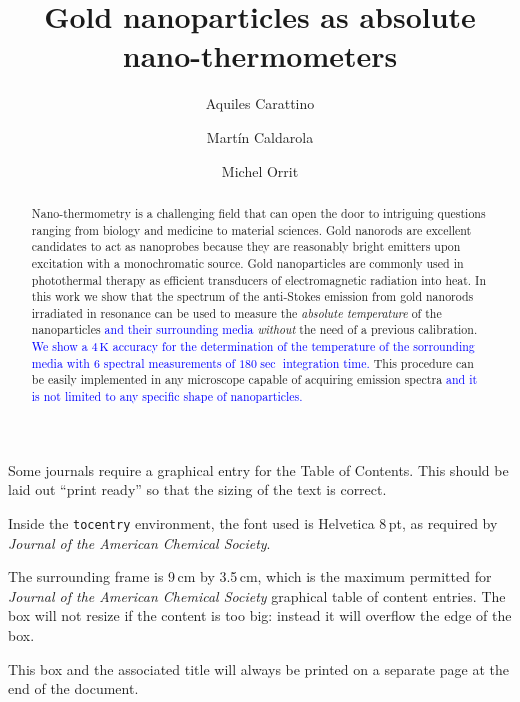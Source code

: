 \documentclass[journal=nalefd,manuscript=letter]{achemso}
\author{Aquiles Carattino}
\affiliation[Leiden]
{Huygens-Kamerlingh Onnes Lab, 2300RA Leiden, The Netherlands}
\author{Mart\'in Caldarola}
\affiliation[Leiden]
{Huygens-Kamerlingh Onnes Lab, 2300RA Leiden, The Netherlands}
\author{Michel Orrit}
\affiliation[Leiden]
{Huygens-Kamerlingh Onnes Lab, 2300RA Leiden, The Netherlands}
\title{Gold nanoparticles as absolute nano-thermometers}
\newcommand{\HI}[1]{\textcolor{blue}{#1}} %
\newcommand{\K}{\ensuremath{\,\textrm{K}}}
\begin{document}

\begin{tocentry}

Some journals require a graphical entry for the Table of Contents.
This should be laid out ``print ready'' so that the sizing of the
text is correct.

Inside the \texttt{tocentry} environment, the font used is Helvetica
8\,pt, as required by \emph{Journal of the American Chemical
Society}.

The surrounding frame is 9\,cm by 3.5\,cm, which is the maximum
permitted for  \emph{Journal of the American Chemical Society}
graphical table of content entries. The box will not resize if the
content is too big: instead it will overflow the edge of the box.

This box and the associated title will always be printed on a
separate page at the end of the document.

\end{tocentry}

\begin{abstract}
Nano-thermometry is a challenging field that can open the door
to intriguing questions ranging from biology and medicine to material sciences.
Gold nanorods are excellent candidates to act as nanoprobes because they are
reasonably bright emitters upon excitation with a monochromatic source.
Gold nanoparticles are commonly used in photothermal therapy as efficient
transducers of electromagnetic radiation into heat. In this work we show that
the spectrum of the anti-Stokes emission from gold nanorods irradiated in
resonance can be used to measure the \textit{absolute temperature} of the nanoparticles \HI{and their
surrounding media} \textit{without} the need of a previous calibration. 
\HI{We show a $4\K$ accuracy for the determination
of the temperature of the sorrounding media with 6 spectral measurements of $180\sec$ integration time.}
This procedure can be easily implemented in any microscope capable of acquiring emission spectra \HI{and it
is not limited to any specific shape of nanoparticles.} 

\end{abstract}
\end{document}
